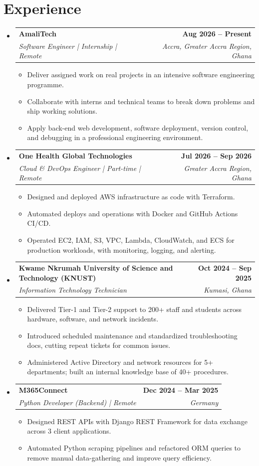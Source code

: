 \documentclass[letterpaper,11pt]{article}
\makeatletter
\newcommand{\resumeItem}[1]{\item\small{#1\vspace{-1pt}}}
\newcommand{\resumeSubheading}[4]{%
  \vspace{-2pt}\item
  \begin{tabular*}{1.0\textwidth}[t]{l@{\extracolsep{\fill}}r}
    \textbf{#1} & \textbf{\small #2} \\
    \textit{\small #3} & \textit{\small #4} \\
  \end{tabular*}\vspace{-7pt}
}
\newcommand{\resumeSubHeadingListStart}{\begin{itemize}[leftmargin=0in, label={}]}
\newcommand{\resumeSubHeadingListEnd}{\end{itemize}}
\newcommand{\resumeItemListStart}{\begin{itemize}[leftmargin=0.15in]}
\newcommand{\resumeItemListEnd}{\end{itemize}\vspace{-5pt}}
\makeatother
\begin{document}
\section{Experience}
\resumeSubHeadingListStart

  \resumeSubheading
    {AmaliTech}{Aug 2026 -- Present}
    {Software Engineer | Internship | Remote}{Accra, Greater Accra Region, Ghana}
  \resumeItemListStart
    \resumeItem{Deliver assigned work on real projects in an intensive software engineering programme.}
    \resumeItem{Collaborate with interns and technical teams to break down problems and ship working solutions.}
    \resumeItem{Apply back-end web development, software deployment, version control, and debugging in a professional engineering environment.}
  \resumeItemListEnd

  \resumeSubheading
    {One Health Global Technologies}{Jul 2026 -- Sep 2026}
    {Cloud \& DevOps Engineer | Part-time | Remote}{Greater Accra Region, Ghana}
  \resumeItemListStart
    \resumeItem{Designed and deployed AWS infrastructure as code with Terraform.}
    \resumeItem{Automated deploys and operations with Docker and GitHub Actions CI/CD.}
    \resumeItem{Operated EC2, IAM, S3, VPC, Lambda, CloudWatch, and ECS for production workloads, with monitoring, logging, and alerting.}
  \resumeItemListEnd

  \resumeSubheading
    {Kwame Nkrumah University of Science and Technology (KNUST)}{Oct 2024 -- Sep 2025}
    {Information Technology Technician}{Kumasi, Ghana}
  \resumeItemListStart
    \resumeItem{Delivered Tier-1 and Tier-2 support to 200+ staff and students across hardware, software, and network incidents.}
    \resumeItem{Introduced scheduled maintenance and standardized troubleshooting docs, cutting repeat tickets for common issues.}
    \resumeItem{Administered Active Directory and network resources for 5+ departments; built an internal knowledge base of 40+ procedures.}
  \resumeItemListEnd

  \resumeSubheading
    {M365Connect}{Dec 2024 -- Mar 2025}
    {Python Developer (Backend) | Remote}{Germany}
  \resumeItemListStart
    \resumeItem{Designed REST APIs with Django REST Framework for data exchange across 3 client applications.}
    \resumeItem{Automated Python scraping pipelines and refactored ORM queries to remove manual data-gathering and improve query efficiency.}
  \resumeItemListEnd

\resumeSubHeadingListEnd

\end{document}
